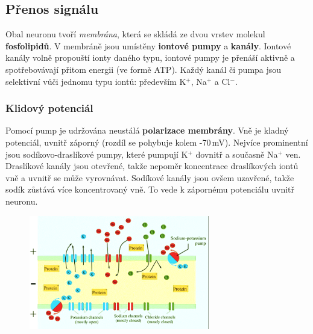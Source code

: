 \documentclass[11pt]{report} %
\numberwithin{equation}{section}
\begin{document}
\subsection{Přenos signálu}
Obal neuronu tvoří \textit{membrána}, která se skládá ze dvou vrstev molekul \textbf{fosfolipidů}. V membráně jsou umístěny \textbf{iontové pumpy} a \textbf{kanály}. Iontové kanály volně propouští ionty daného typu, iontové pumpy je přenáší aktivně a spotřebovávají přitom energii (ve formě ATP). Každý kanál či pumpa jsou selektivní vůči jednomu typu iontů: především K$^+$, Na$^+$ a Cl$^-$.

\subsubsection{Klidový potenciál}
Pomocí pump je udržována neustálá \textbf{polarizace membrány}. Vně je kladný potenciál, uvnitř záporný (rozdíl se pohybuje kolem -70\,mV). Nejvíce prominentní jsou sodíkovo-draslíkové pumpy, které pumpují K$^+$ dovnitř a současně Na$^+$ ven. Draslíkové kanály jsou otevřené, takže nepoměr koncentrace draslíkových iontů vně a uvnitř se může vyrovnávat. Sodíkové kanály jsou ovšem uzavřené, takže sodík zůstává více koncentrovaný vně. To vede k zápornému potenciálu uvnitř neuronu.

\begin{figure}[H]
	\centering
	\includegraphics[width=0.7\textwidth]{img/resting_potential.png}
\end{figure}
\end{document}
